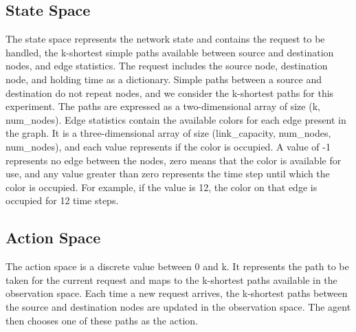 \documentclass[conference]{IEEEtran}
\begin{document}
\subsection{State Space}
\vspace{0.5em}
The state space represents the network state and contains the request to be handled, the k-shortest simple paths available between source and destination nodes, and edge statistics. The request includes the source node, destination node, and holding time as a dictionary. Simple paths between a source and destination do not repeat nodes, and we consider the k-shortest paths for this experiment. The paths are expressed as a two-dimensional array of size (k, num\_nodes). Edge statistics contain the available colors for each edge present in the graph. It is a three-dimensional array of size (link\_capacity, num\_nodes, num\_nodes), and each value represents if the color is occupied. A value of -1 represents no edge between the nodes, zero means that the color is available for use, and any value greater than zero represents the time step until which the color is occupied. For example, if the value is 12, the color on that edge is occupied for 12 time steps.

\subsection{Action Space}
\vspace{0.5em}
The action space is a discrete value between 0 and k. It represents the path to be taken for the current request and maps to the k-shortest paths available in the observation space. Each time a new request arrives, the k-shortest paths between the source and destination nodes are updated in the observation space. The agent then chooses one of these paths as the action.
\end{document}

